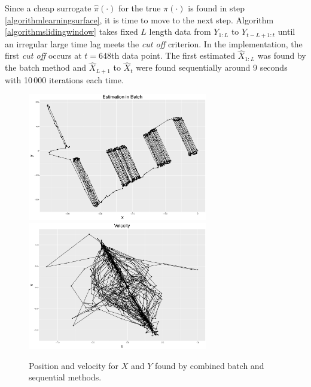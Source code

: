 Since a cheap surrogate $\hat{\pi}(\cdot)$ for the true $\pi(\cdot)$ is found in step \ref{algorithmlearningsurface}, it is time to move to the next step. Algorithm \ref{algorithmslidingwindow} takes fixed $L$ length data from $Y_{1:L}$ to $Y_{t-L+1:t}$ until an irregular large time lag meets the \textit{cut off} criterion. In the implementation, the first \textit{cut off} occurs at $t = 648$th data point. The first estimated $\hat{X}_{1:L}$ was found by the batch method and $\hat{X}_{L+1}$ to $\hat{X}_{t}$ were found sequentially around 9 seconds with 10\,000 iterations each time. 

\begin{figure}[h]
\centering
\includegraphics[width=0.7\textwidth]{Chapters/05MCMCOU/plots/realdatabatchPosition.pdf}
\includegraphics[width=0.7\textwidth]{Chapters/05MCMCOU/plots/realdatabatchVelocity.pdf}
\caption{Position and velocity for $X$ and $Y$ found by combined batch and sequential methods. }
\end{figure}

